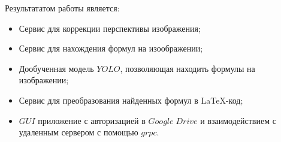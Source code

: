 Результататом работы является:
\begin{itemize}
    \item Сервис для коррекции перспективы изображения;
    \item Сервис для нахождения формул на изоображении;
    \item Дообученная модель $YOLO$, позволяющая находить формулы на изображении;
    \item Сервис для преобразования найденных формул в \LaTeX-код;
    \item $GUI$ приложение с авторизацией в $Google\; Drive$ и взаимодействием с удаленным сервером с помощью $grpc$.
\end{itemize}